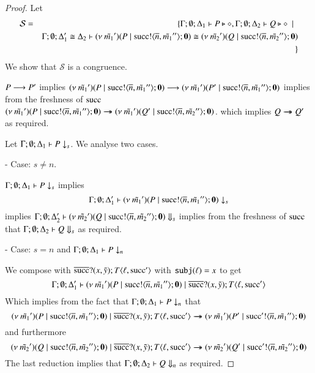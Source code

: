 \begin{proof}
	\noi Let
%
	\begin{eqnarray*}
		\mathcal{S}	&=&
					\set{\Gamma; \es; \Delta_1 \proves P \hastype \Proc, \Gamma; \es; \Delta_2 \proves Q \hastype \Proc \setbar \\
				& &	\horel{\Gamma}{\Delta_1'}{\newsp{\tilde{m_1}'}{P \Par \bout{\suc}{\dual{n}, \tilde{m_1}''} \inact}}
					{\cong}{\Delta_2}{\newsp{\tilde{m_2}'}{Q \Par \bout{\suc}{\dual{n}, \tilde{m_2}''} \inact}} \\
		&&}
	\end{eqnarray*}
%
	\noi We show that $\mathcal{S}$ is a congruence.


	\noi $P \red P'$
	implies
	$\newsp{\tilde{m_1}'}{P \Par \bout{\suc}{\dual{n}, \tilde{m_1}''} \inact} \red \newsp{\tilde{m_1}'}{P' \Par \bout{\suc}{\dual{n}, \tilde{m_1}''} \inact}$
	implies from the freshness of $\suc$
	$\newsp{\tilde{m_1}'}{P \Par \bout{\suc}{\dual{n}, \tilde{m_1}''} \inact} \Red \newsp{\tilde{m_1}'}{Q' \Par \bout{\suc}{\dual{n}, \tilde{m_2}''} \inact}$.
	which implies
	$Q \Red Q'$ as required.


	\noi Let $\Gamma; \es; \Delta_1 \proves P \barb{s}$. We analyse two cases.

	\noi - Case: $s \not= n$.

	\noi $\Gamma; \es; \Delta_1 \proves P \barb{s}$
	implies
\[
	\Gamma; \es; \Delta_1' \proves \newsp{\tilde{m_1}'}{P \Par \bout{\suc}{\dual{n}, \tilde{m_1}''} \inact} \barb{s}
\]
	\noi implies
	$\Gamma; \es; \Delta_2' \proves \newsp{\tilde{m_2}'}{Q \Par \bout{\suc}{\dual{n}, \tilde{m_2}''} \inact} \Barb{s}$
	implies from the freshness of $\suc$ that
	$\Gamma; \es; \Delta_2 \proves Q \Barb{s}$ as required.

	\noi - Case: $s = n$ and $\Gamma; \es; \Delta_1 \proves P \barb{n}$

	\noi We compose with $\binp{\dual{\suc}}{x, \tilde{y}} T\lrangle{\ell, \suc'}$ with $\subj{\ell} = x$ to get
\[
	\Gamma; \es; \Delta_1' \proves \newsp{\tilde{m_1}'}{P \Par \bout{\suc}{\dual{n}, \tilde{m_1}''} \inact} \Par \binp{\dual{\suc}}{x, \tilde{y}} T\lrangle{\ell, \suc'}
\]
	\noi Which implies from the fact that $\Gamma; \es; \Delta_1 \proves P \barb{n}$ that
\[
		\newsp{\tilde{m_1}'}{P \Par \bout{\suc}{\dual{n}, \tilde{m_1}''} \inact} \Par \binp{\dual{\suc}}{x, \tilde{y}} T\lrangle{\ell, \suc'} \Red 
	\newsp{\tilde{m_1}'}{P' \Par \bout{\suc'}{\dual{n}, \tilde{m_1}''} \inact}
\]
	\noi and furthermore
\[
	\newsp{\tilde{m_2}'}{Q \Par \bout{\suc}{\dual{n}, \tilde{m_2}''} \inact} \Par \binp{\dual{\suc}}{x, \tilde{y}} T\lrangle{\ell, \suc'} \Red 
	\newsp{\tilde{m_2}'}{Q' \Par \bout{\suc'}{\dual{n}, \tilde{m_2}''} \inact}
\]
	\noi The last reduction implies that
	$\Gamma; \es; \Delta_2 \proves Q \Barb{n}$ as required.


\end{proof}
